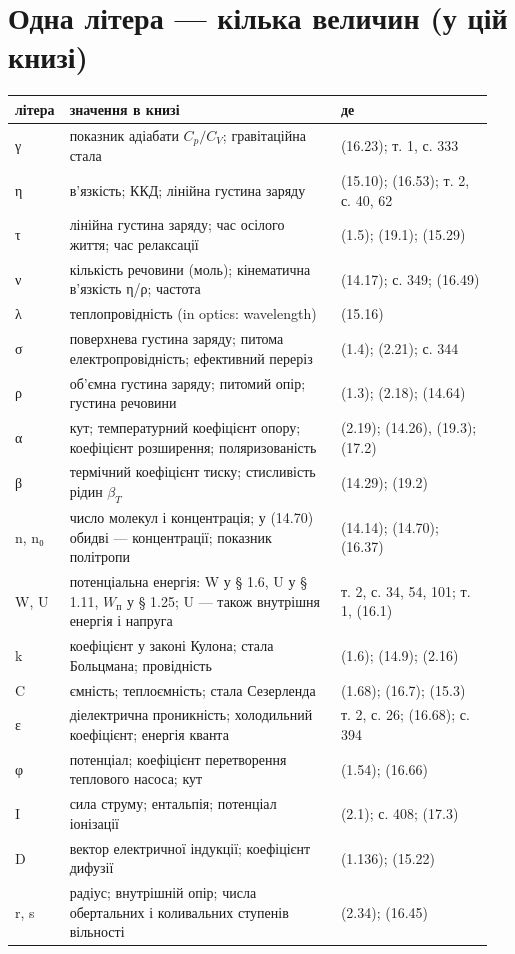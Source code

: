 \documentclass[11pt,a4paper,oneside]{book}
\begin{document}
\section*{Одна літера — кілька величин (у цій книзі)}

{\small
\begin{longtable}{>{\raggedright\arraybackslash}p{0.078\linewidth}>{\raggedright\arraybackslash}p{0.559\linewidth}>{\raggedright\arraybackslash}p{0.315\linewidth}}
\toprule
\textbf{літера} & \textbf{значення в книзі} & \textbf{де} \\
\midrule
\endhead
γ & показник адіабати $C_p/C_V$; гравітаційна стала & (16.23); т. 1, с. 333 \\
η & в'язкість; ККД; лінійна густина заряду & (15.10); (16.53); т. 2, с. 40, 62 \\
τ & лінійна густина заряду; час осілого життя; час релаксації & (1.5); (19.1); (15.29) \\
ν & кількість речовини (моль); кінематична в'язкість η/ρ; частота & (14.17); с. 349; (16.49) \\
λ & теплопровідність (in optics: wavelength) & (15.16) \\
σ & поверхнева густина заряду; питома електропровідність; ефективний переріз & (1.4); (2.21); с. 344 \\
ρ & об'ємна густина заряду; питомий опір; густина речовини & (1.3); (2.18); (14.64) \\
α & кут; температурний коефіцієнт опору; коефіцієнт розширення; поляризованість & (2.19); (14.26), (19.3); (17.2) \\
β & термічний коефіцієнт тиску; стисливість рідин $\beta_T$ & (14.29); (19.2) \\
n, n₀ & число молекул і концентрація; у (14.70) обидві — концентрації; показник політропи & (14.14); (14.70); (16.37) \\
W, U & потенціальна енергія: W у § 1.6, U у § 1.11, $W_\text{п}$ у § 1.25; U — також внутрішня енергія і напруга & т. 2, с. 34, 54, 101; т. 1, (16.1) \\
k & коефіцієнт у законі Кулона; стала Больцмана; провідність & (1.6); (14.9); (2.16) \\
C & ємність; теплоємність; стала Сезерленда & (1.68); (16.7); (15.3) \\
ε & діелектрична проникність; холодильний коефіцієнт; енергія кванта & т. 2, с. 26; (16.68); с. 394 \\
φ & потенціал; коефіцієнт перетворення теплового насоса; кут & (1.54); (16.66) \\
I & сила струму; ентальпія; потенціал іонізації & (2.1); с. 408; (17.3) \\
D & вектор електричної індукції; коефіцієнт дифузії & (1.136); (15.22) \\
r, s & радіус; внутрішній опір; числа обертальних і коливальних ступенів вільності & (2.34); (16.45) \\
\bottomrule
\end{longtable}
}
\end{document}
